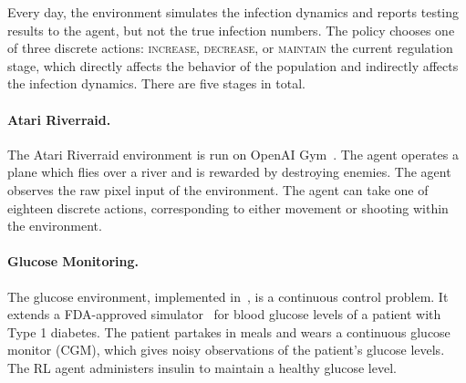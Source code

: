 Every day, the environment simulates the infection dynamics and reports testing results to the agent, but not the true infection numbers. The policy chooses one of three discrete actions: \textsc{increase}, \textsc{decrease}, or \textsc{maintain} the current regulation stage, which directly affects the behavior of the population and indirectly affects the infection dynamics. There are five stages in total. %




\paragraph{Atari Riverraid.}
The Atari Riverraid environment is run on OpenAI Gym~\citep{brockman2016gym}. %
The agent operates a plane which flies over a river and is rewarded by destroying enemies. 
The agent observes the raw pixel input of the environment. The agent can take one of eighteen discrete actions, corresponding to either movement or shooting within the environment. %

\paragraph{Glucose Monitoring.}
The glucose environment, implemented in~\citet{fox2020bgp}, is a continuous control problem. It extends a FDA-approved simulator~\citep{man2014diabetes} for blood glucose levels of a patient with Type 1 diabetes. The patient partakes in meals and wears a continuous glucose monitor (CGM), which gives noisy observations of the patient's glucose levels. The RL agent administers insulin to maintain a healthy glucose level.


